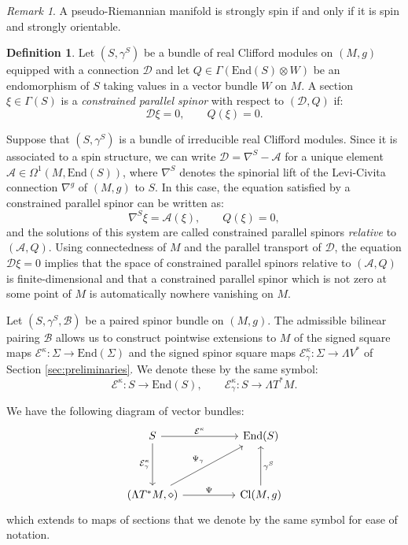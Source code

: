 \documentclass[10pt,reqno]{amsart}
\theoremstyle{definition}
\newtheorem{definition}[theorem]{Definition}
\theoremstyle{remark}
\newtheorem{remark}[theorem]{Remark}
\newcommand{\End}{\mathrm{End}}
\begin{document}
\begin{remark}
    A pseudo-Riemannian manifold is strongly spin if and only if it is spin and strongly orientable.
\end{remark}

\begin{definition}
    Let $(S,\gamma^S)$ be a bundle of real Clifford modules on $(M,g)$ equipped with a connection $\mathcal{D}$ and let $Q\in\Gamma(\End(S)\otimes W)$ be an endomorphism of $S$ taking values in a vector bundle $W$ on $M$. A section $\xi\in\Gamma(S)$ is a \emph{constrained parallel spinor} with respect to $(\mathcal{D},Q)$ if: $$\mathcal{D}\xi=0,\qquad Q(\xi)=0.$$
\end{definition}

Suppose that $(S,\gamma^S)$ is a bundle of irreducible real Clifford modules. Since it is associated to a spin structure, we can write $\mathcal{D}=\nabla^S-\mathcal{A}$ for a unique element $\mathcal{A}\in\Omega^1(M,\End(S))$, where $\nabla^S$ denotes the spinorial lift of the Levi-Civita connection $\nabla^g$ of $(M,g)$ to $S$. In this case, the equation satisfied by a constrained parallel spinor can be written as: $$\nabla^S\xi=\mathcal{A}(\xi),\qquad Q(\xi)=0,$$ and the solutions of this system are called constrained parallel spinors \emph{relative} to $(\mathcal{A},Q)$. Using connectedness of $M$ and the parallel transport of $\mathcal{D}$, the equation $\mathcal{D}\xi=0$ implies that the space of constrained parallel spinors relative to $(\mathcal{A},Q)$ is finite-dimensional and that a constrained parallel spinor which is not zero at some point of $M$ is automatically nowhere vanishing on $M$.\medskip

Let $(S,\gamma^S,\mathscr{B})$ be a paired spinor bundle on $(M,g)$. The admissible bilinear pairing $\mathscr{B}$ allows us to construct pointwise extensions to $M$ of the signed square maps $\mathcal{E}^\kappa\colon\Sigma\to\End(\Sigma)$ and the signed spinor square maps $\mathcal{E}^\kappa_\gamma\colon\Sigma\to\Lambda V^*$ of Section \ref{sec:preliminaries}. We denote these by the same symbol: $$\mathcal{E}^\kappa\colon S\to\End(S),\qquad \mathcal{E}^\kappa_\gamma\colon S\to\Lambda T^*M.$$

We have the following diagram of vector bundles: $$\begin{tikzcd}
S \arrow[rr, "\mathcal{E}^\kappa"] \arrow[dd, "\mathcal{E}^\kappa_\gamma"'] &  & \End(S)                                 \\
                                                                                 &  &                                              \\
(\Lambda T^*M,\diamond) \arrow[rr, "\Psi"] \arrow[rruu, "\Psi_\gamma"]                       &  & {\mathrm{Cl}(M,g)} \arrow[uu, "\gamma^S"']
\end{tikzcd}$$ which extends to maps of sections that we denote by the same symbol for ease of notation.
\end{document}
